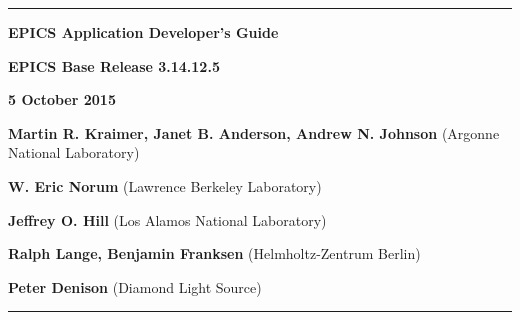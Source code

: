 \hrule

\vspace{1in}

\noindent \Huge \textbf{EPICS Application Developer's Guide}

\vspace{0.5in}

\noindent \Large \textbf{EPICS Base Release 3.14.12.5}

\noindent \textbf{5 October 2015}

\vspace{0.5in}

\normalsize
\noindent \textbf{Martin R. Kraimer, Janet B. Anderson, Andrew N. Johnson} (Argonne National Laboratory)

\noindent \textbf{W. Eric Norum} (Lawrence Berkeley Laboratory)

\noindent \textbf{Jeffrey O. Hill} (Los Alamos National Laboratory)

\noindent \textbf{Ralph Lange, Benjamin Franksen} (Helmholtz-Zentrum Berlin)

\noindent \textbf{Peter Denison} (Diamond Light Source)

\vspace{1in}
\hrule
